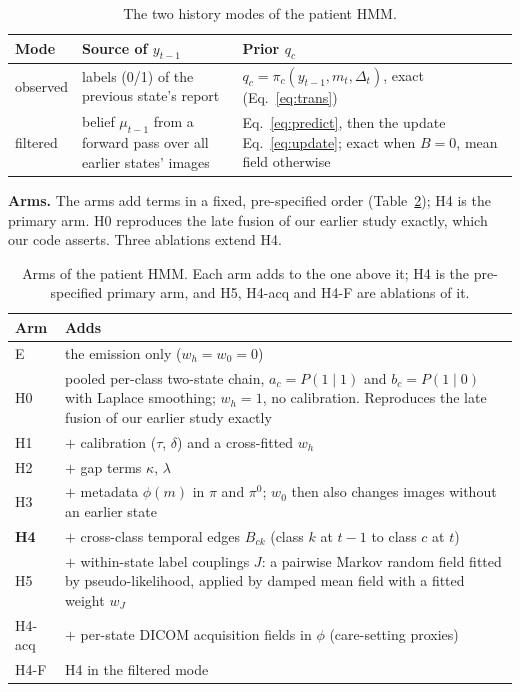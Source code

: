 \documentclass[conference]{IEEEtran}
\begin{document}
\begin{table}[htbp]
\caption{The two history modes of the patient HMM.}
\begin{center}
\footnotesize
\setlength{\tabcolsep}{3pt}
\begin{tabular}{|l|>{\raggedright\arraybackslash}p{2.9cm}|>{\raggedright\arraybackslash}p{3.3cm}|}
\hline
\textbf{Mode} & \textbf{Source of $y_{t-1}$} & \textbf{Prior $q_c$} \\
\hline
observed & labels (0/1) of the previous state's report & $q_c = \pi_c(y_{t-1}, m_t, \Delta_t)$, exact (Eq.~\eqref{eq:trans}) \\
\hline
filtered & belief $\mu_{t-1}$ from a forward pass over all earlier states' images & Eq.~\eqref{eq:predict}, then the update Eq.~\eqref{eq:update}; exact when $B = 0$, mean field otherwise \\
\hline
\end{tabular}
\label{tab:modes}
\end{center}
\end{table}

\textbf{Arms.} The arms add terms in a fixed, pre-specified order (Table~\ref{tab:arms}); H4 is the primary arm. H0 reproduces the late fusion of our earlier study exactly, which our code asserts. Three ablations extend H4.

\begin{table}[htbp]
\caption{Arms of the patient HMM. Each arm adds to the one above it; H4 is the pre-specified primary arm, and H5, H4-acq and H4-F are ablations of it.}
\begin{center}
\footnotesize
\setlength{\tabcolsep}{3pt}
\begin{tabular}{|l|>{\raggedright\arraybackslash}p{6.6cm}|}
\hline
\textbf{Arm} & \textbf{Adds} \\
\hline
E & the emission only ($w_h = w_0 = 0$) \\
H0 & pooled per-class two-state chain, $a_c = P(1 \mid 1)$ and $b_c = P(1 \mid 0)$ with Laplace smoothing; $w_h = 1$, no calibration. Reproduces the late fusion of our earlier study exactly \\
H1 & $+$ calibration ($\tau$, $\delta$) and a cross-fitted $w_h$ \\
H2 & $+$ gap terms $\kappa$, $\lambda$ \\
H3 & $+$ metadata $\phi(m)$ in $\pi$ and $\pi^{0}$; $w_0$ then also changes images without an earlier state \\
\textbf{H4} & $+$ cross-class temporal edges $B_{ck}$ (class $k$ at $t-1$ to class $c$ at $t$) \\
\hline
H5 & $+$ within-state label couplings $J$: a pairwise Markov random field fitted by pseudo-likelihood, applied by damped mean field with a fitted weight $w_J$ \\
H4-acq & $+$ per-state DICOM acquisition fields in $\phi$ (care-setting proxies) \\
H4-F & H4 in the filtered mode \\
\hline
\end{tabular}
\label{tab:arms}
\end{center}
\end{table}
\end{document}
